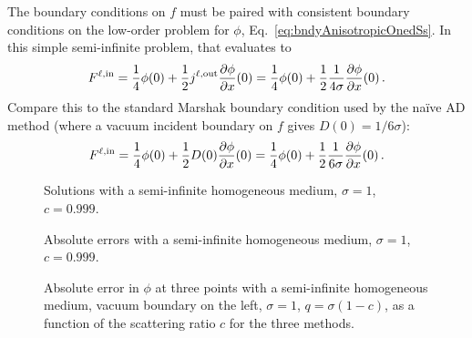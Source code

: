 The boundary conditions on $f$ must be paired with consistent boundary
conditions on the low-order problem for $\phi$,
Eq.~\eqref{eq:bndyAnisotropicOnedSs}. In this simple semi-infinite problem,
that evaluates to
\begin{equation*}
  F^{\ell,\mathrm{in}}
  = \frac{1}{4} \phi(0)
  + \frac{1}{2} j^{\ell,\mathrm{out}} \frac{\partial \phi}{\partial x}(0)
  = \frac{1}{4} \phi(0)
  + \frac{1}{2} \frac{1}{4\sigma} \frac{\partial \phi}{\partial x}(0) \,.
\end{equation*}
Compare this to the standard Marshak boundary condition used by the na\"ive AD
method (where a vacuum incident boundary on $f$ gives $D(0)=1/6\sigma$):
\begin{equation*}
  F^{\ell,\mathrm{in}}
  = \frac{1}{4} \phi(0)
  + \frac{1}{2} D(0) \frac{\partial \phi}{\partial x}(0)
  = \frac{1}{4} \phi(0)
  + \frac{1}{2} \frac{1}{6\sigma} \frac{\partial \phi}{\partial x}(0) \,.
\end{equation*}

\begin{figure}[htb]
  \centering
  \hspace{-.6in}
  \subfigure[$q=0.001$, $F^{\ell,\mathrm{in}}=0$]{
  
  }
  \hspace{-.2in}
  \subfigure[$q=0$, $F^{\ell,\mathrm{in}}=1$]{
  
  }
  \hspace{-.6in}
  \caption{Solutions with a semi-infinite homogeneous medium, $\sigma=1$,
  $c=0.999$.}
  \label{fig:bndycondSolutions}
\end{figure}

\begin{figure}[htb]
  \centering
  \hspace{-.6in}
  \subfigure[$q=0.001$, $F^{\ell,\mathrm{in}}=0$]{
  
  }
  \hspace{-.2in}
  \subfigure[$q=0$, $F^{\ell,\mathrm{in}}=1$]{
  
  }
  \hspace{-.6in}
  \caption{Absolute errors with a semi-infinite homogeneous medium, $\sigma=1$,
  $c=0.999$.}
  \label{fig:bndycondErrors}
\end{figure}

\begin{figure}[htb]
  \centering
  
  \caption{Absolute error in $\phi$ at three points with a semi-infinite
  homogeneous medium, vacuum boundary on the left, $\sigma=1$,
  $q=\sigma(1-c)$, as a function of the scattering ratio $c$ for the three
  methods.}
  \label{fig:bndycondHomogC}
\end{figure}

